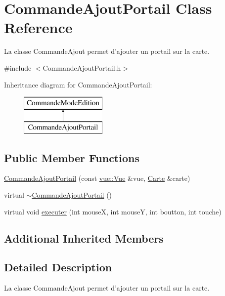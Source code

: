\hypertarget{class_commande_ajout_portail}{\section{Commande\-Ajout\-Portail Class Reference}
\label{class_commande_ajout_portail}
}


La classe Commande\-Ajout permet d'ajouter un portail sur la carte.  




{\ttfamily \#include $<$Commande\-Ajout\-Portail.\-h$>$}

Inheritance diagram for Commande\-Ajout\-Portail\-:\begin{figure}[H]
\begin{center}
\leavevmode
\includegraphics[height=2.000000cm]{class_commande_ajout_portail}
\end{center}
\end{figure}
\subsection*{Public Member Functions}
\begin{DoxyCompactItemize}
\item 
\hyperlink{class_commande_ajout_portail_a9bb23c57a5e651761ef1f2942c8beb34}{Commande\-Ajout\-Portail} (const \hyperlink{classvue_1_1_vue}{vue\-::\-Vue} \&vue, \hyperlink{class_carte}{Carte} \&carte)
\item 
virtual \hyperlink{class_commande_ajout_portail_aa146f3ca92f445cba4770a586a29c163}{$\sim$\-Commande\-Ajout\-Portail} ()
\item 
virtual void \hyperlink{class_commande_ajout_portail_a1b5ac4fd38f34e785aa61a3ce6fd5702}{executer} (int mouse\-X, int mouse\-Y, int boutton, int touche)
\end{DoxyCompactItemize}
\subsection*{Additional Inherited Members}


\subsection{Detailed Description}
La classe Commande\-Ajout permet d'ajouter un portail sur la carte. 

